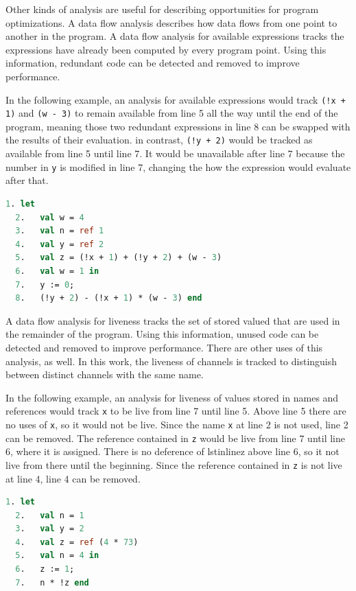 \documentclass{article}
\begin{document}
Other kinds of analysis are useful for describing opportunities for program optimizations.
A data flow analysis describes how data flows from one point to another in the program.
A data flow analysis for available expressions tracks the expressions have already been
computed by every program point. Using this information, redundant code can be detected and
removed to improve performance.

In the following example, an analysis for available expressions would track
\lstinline{(!x + 1)} and \lstinline{(w - 3)} to remain available from line 5 all the way until
the end of the program, meaning those two redundant expressions in line 8 can be swapped with
the results of their evaluation. in contrast, \lstinline{(!y + 2)} would be tracked as
available
from line 5 until line 7. It would be unavailable after line 7 because the number in
\lstinline{y} is modified in line 7, changing the how the expression would evaluate after
that.

\begin{lstlisting}[language=ML, mathescape]
  1. let
  2.   val w = 4
  3.   val n = ref 1
  4.   val y = ref 2
  5.   val z = (!x + 1) + (!y + 2) + (w - 3)
  6.   val w = 1 in
  7.   y := 0;
  8.   (!y + 2) - (!x + 1) * (w - 3) end
  \end{lstlisting}

A data flow analysis for liveness tracks the set of stored valued that are used in the
remainder of the program. Using this information, unused code can
be detected and removed to improve performance. There are other uses of this analysis, as well.
In this work, the liveness of channels is tracked to distinguish between distinct channels with
the same name. 

In the following example, an analysis for liveness of values stored in names and references
would track \lstinline{x} to be live from line 7 until line 5. Above line 5 there are no uses
of \lstinline{x}, so it would not be live. Since the name \lstinline{x} at line 2 is not used,
line 2 can be removed. The reference contained in \lstinline{z} would be
live from line 7 until line 6, where it is assigned. There is no deference of lstinline{z}
above line 6, so it not live from there until the beginning. Since the reference contained in
\lstinline{z} is not live at line 4, line 4 can be removed.

\begin{lstlisting}[language=ML, mathescape]
  1. let 
  2.   val n = 1  
  3.   val y = 2
  4.   val z = ref (4 * 73)
  5.   val n = 4 in 
  6.   z := 1; 
  7.   n * !z end
  \end{lstlisting}
\end{document}
